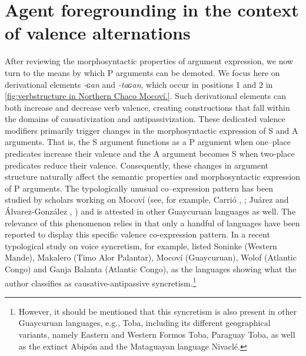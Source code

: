 \documentclass[12pt]{article}
\begin{document}
\section{Agent foregrounding in the context of valence alternations}
After reviewing the morphosyntactic properties of argument expression, we now turn to the means by which P arguments can be demoted. We focus here on derivational elements \textit{-ɢan} and \textit{-taɢan}, which occur in positions 1 and 2 in \autoref{fig:verbstructure in Northern Chaco Mocoví.}. Such derivational elements can both increase and decrease verb valence, creating constructions that fall within the domains of causativization and antipassivization. These dedicated valence modifiers primarily trigger changes in the morphosyntactic expression of S and A  arguments. That is, the S argument functions as a P argument when one--place predicates increase their valence and the A argument becomes S when two-place predicates reduce their valence. Consequently, these changes in argument structure naturally affect the semantic properties and morphosyntactic expression of P arguments.  The typologically unusual co--expression pattern has been studied by scholars working on Mocoví  (see, for example, Carrió \citeyear{Carrio2015a}, \citeyear{Carrio2015}; Juárez and Álvarez-González \citeyear{Juarez2017c}, \citeyear{juarez.alvarez-gonzalez2021}) and is attested in other Guaycuruan languages as well. The relevance of this phenomenon relies in that only a  handful of languages have been reported to display this specific valence co-expression pattern. In a recent typological study on voice syncretism, for example,  \citet[][100--103]{bahrt2021} listed Soninke (Western Mande), Makalero (Timo Alor Palantar), Mocoví (Guaycuruan), Wolof (Atlantic Congo)  and Ganja Balanta (Atlantic Congo), as the languages showing what the author classifies as causative-antipassive syncretism.\footnote{However, it should be mentioned that this syncretism is also present in other Guaycuruan languages, e.g., Toba, including its different geographical variants, namely Eastern and Western Formos Toba, Paraguay Toba, as well as the extinct Abipón and the Mataguayan language Nivaclé.}  
\end{document}
